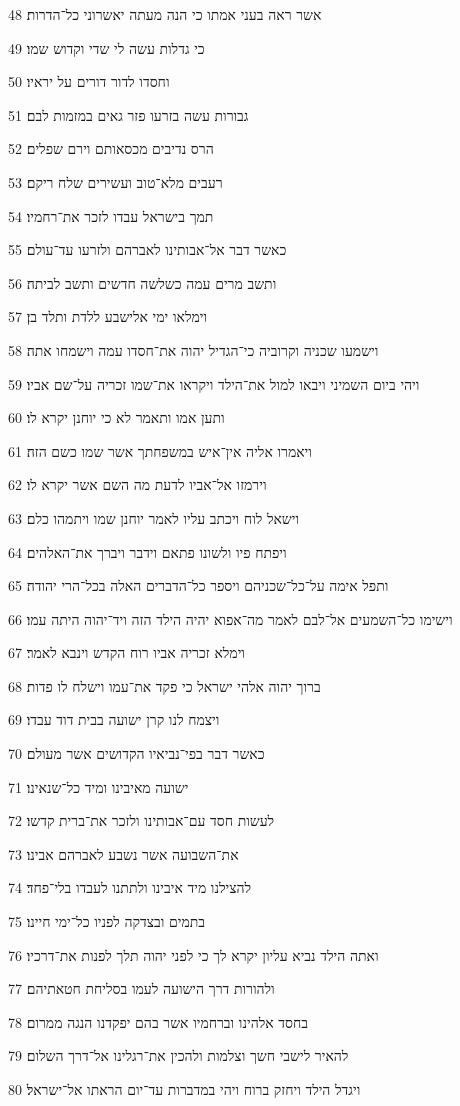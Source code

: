 \par 48 אשר ראה בעני אמתו כי הנה מעתה יאשרוני כל־הדרות׃
\par 49 כי גדלות עשה לי שדי וקדוש שמו׃
\par 50 וחסדו לדור דורים על יראיו׃
\par 51 גבורות עשה בזרעו פזר גאים במזמות לבם׃
\par 52 הרס נדיבים מכסאותם וירם שפלים׃
\par 53 רעבים מלא־טוב ועשירים שלח ריקם׃
\par 54 תמך בישראל עבדו לזכר את־רחמיו׃
\par 55 כאשר דבר אל־אבותינו לאברהם ולזרעו עד־עולם׃
\par 56 ותשב מרים עמה כשלשה חדשים ותשב לביתה׃
\par 57 וימלאו ימי אלישבע ללדת ותלד בן׃
\par 58 וישמעו שכניה וקרוביה כי־הגדיל יהוה את־חסדו עמה וישמחו אתה׃
\par 59 ויהי ביום השמיני ויבאו למול את־הילד ויקראו את־שמו זכריה על־שם אביו׃
\par 60 ותען אמו ותאמר לא כי יוחנן יקרא לו׃
\par 61 ויאמרו אליה אין־איש במשפחתך אשר שמו כשם הזה׃
\par 62 וירמזו אל־אביו לדעת מה השם אשר יקרא לו׃
\par 63 וישאל לוח ויכתב עליו לאמר יוחנן שמו ויתמהו כלם׃
\par 64 ויפתח פיו ולשונו פתאם וידבר ויברך את־האלהים׃
\par 65 ותפל אימה על־כל־שכניהם ויספר כל־הדברים האלה בכל־הרי יהודה׃
\par 66 וישימו כל־השמעים אל־לבם לאמר מה־אפוא יהיה הילד הזה ויד־יהוה היתה עמו׃
\par 67 וימלא זכריה אביו רוח הקדש וינבא לאמר׃
\par 68 ברוך יהוה אלהי ישראל כי פקד את־עמו וישלח לו פדות׃
\par 69 ויצמח לנו קרן ישועה בבית דוד עבדו׃
\par 70 כאשר דבר בפי־נביאיו הקדושים אשר מעולם׃
\par 71 ישועה מאיבינו ומיד כל־שנאינו׃
\par 72 לעשות חסד עם־אבותינו ולזכר את־ברית קדשו׃
\par 73 את־השבועה אשר נשבע לאברהם אבינו׃
\par 74 להצילנו מיד איבינו ולתתנו לעבדו בלי־פחד׃
\par 75 בתמים ובצדקה לפניו כל־ימי חיינו׃
\par 76 ואתה הילד נביא עליון יקרא לך כי לפני יהוה תלך לפנות את־דרכיו׃
\par 77 ולהורות דרך הישועה לעמו בסליחת חטאתיהם׃
\par 78 בחסד אלהינו וברחמיו אשר בהם יפקדנו הנגה ממרום׃
\par 79 להאיר לישבי חשך וצלמות ולהכין את־רגלינו אל־דרך השלום׃
\par 80 ויגדל הילד ויחזק ברוח ויהי במדברות עד־יום הראתו אל־ישראל׃

